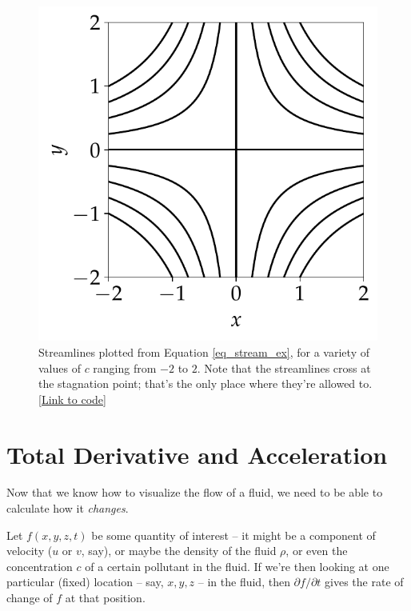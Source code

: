 \begin{figure}[t]
\centering\includegraphics[width=0.5\linewidth]{Figures/Chapter1/fig_streamline_example}
\caption{Streamlines plotted from Equation \ref{eq_stream_ex}, for a variety of values of $c$ ranging from $-2$ to $2$.  Note that the streamlines cross at the stagnation point; that's the only place where they're allowed to. \href{https://nbviewer.jupyter.org/github/josephmacmillan/IntroFluidDynamics/blob/master/Jupyter/1-Introduction.ipynb\#Figure-1.3:-Plotting-Streamlines}{[Link to code]}}
\label{fig_streamline_example}
\end{figure}







\section{Total Derivative and Acceleration}

Now that we know how to visualize the flow of a fluid, we need to be able to calculate how it \emph{changes}.  

Let $f(x, y, z, t)$ be some quantity of interest -- it might be a component of velocity ($u$ or $v$, say), or maybe the density of the fluid $\rho$, or even the concentration $c$ of a certain pollutant in the fluid.  If we're then looking at one particular (fixed) location -- say, $x, y, z$ -- in the fluid, then $\partial f / \partial t$ gives the rate of change of $f$ at that position.

